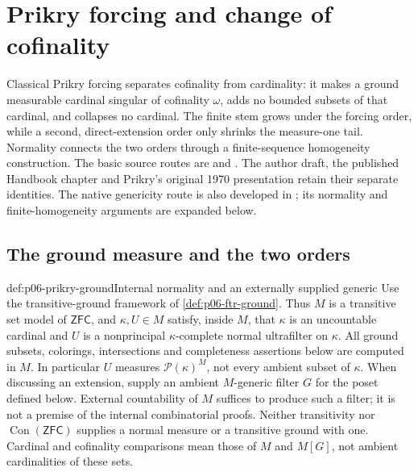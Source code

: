 \section{Prikry forcing and change of cofinality}
\label{sec:p06-prikry-forcing-cofinality}

Classical Prikry forcing separates cofinality from cardinality: it makes a
ground measurable cardinal singular of cofinality \(\omega\), adds no
bounded subsets of that cardinal, and collapses no cardinal. The finite
stem grows under the forcing order, while a second, direct-extension
order only shrinks the measure-one tail. Normality connects the two
orders through a finite-sequence homogeneity construction. The basic
source routes are \cite[\S1.1, Lemmas~1.1--1.13]{GitikPrikryAuthorDraft}
and \cite[\S9, version of 24 August 2026]{Karagila2026ForcingNotes}.
The author draft, the published Handbook chapter and Prikry's original
1970 presentation \cite{Prikry1970OriginalMetadata} retain their separate
identities. The native genericity route is also developed in
\cite[Theorem~2.2 and Lemmas~2.5--2.6]{Mathias1973PrikryNative}; its
normality and finite-homogeneity arguments are expanded below.

\subsection{The ground measure and the two orders}

\begin{hbconvention}{def:p06-prikry-ground}{Internal normality and an externally supplied generic}
Use the transitive-ground framework of \cref{def:p06-ftr-ground}.
Thus \(M\) is a transitive set model of \(\mathsf{ZFC}\), and
\(\kappa,U\in M\) satisfy, inside \(M\), that \(\kappa\) is an
uncountable cardinal and \(U\) is a nonprincipal \(\kappa\)-complete
normal ultrafilter on \(\kappa\). All ground subsets, colorings,
intersections and completeness assertions below are computed in \(M\).
In particular \(U\) measures \(\mathcal P(\kappa)^M\), not every
ambient subset of \(\kappa\). When discussing an extension, supply an
ambient \(M\)-generic filter \(G\) for the poset defined below.
External countability of \(M\) suffices to produce such a filter; it is
not a premise of the internal combinatorial proofs. Neither transitivity
nor \(\operatorname{Con}(\mathsf{ZFC})\) supplies a normal measure or
a transitive ground with one. Cardinal and cofinality comparisons mean
those of \(M\) and \(M[G]\), not ambient cardinalities of these sets.
\end{hbconvention}

